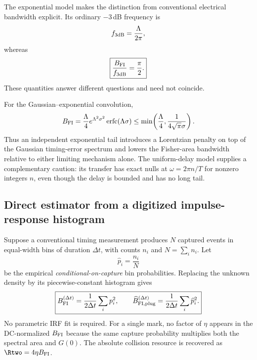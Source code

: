 The exponential model makes the distinction from conventional electrical bandwidth explicit. Its ordinary $-3\,$dB frequency is
\begin{equation}
f_{3\rm dB}=\frac{\Lambda}{2\pi},
\end{equation}
whereas
\begin{equation}
\boxed{\frac{B_{\rm FI}}{f_{3\rm dB}}=\frac{\pi}{2}.}
\label{eq:BFI3dB}
\end{equation}
These quantities answer different questions and need not coincide.

For the Gaussian--exponential convolution,
\begin{equation}
B_{\rm FI}
=\frac{\Lambda}{4}e^{\Lambda^2\sigma^2}\operatorname{erfc}(\Lambda\sigma)
\le \min\!\left(\frac{\Lambda}{4},\frac{1}{4\sqrt{\pi}\sigma}\right).
\label{eq:exGaussianBFI}
\end{equation}
Thus an independent exponential tail introduces a Lorentzian penalty on top of the Gaussian timing-error spectrum and lowers the Fisher-area bandwidth relative to either limiting mechanism alone. The uniform-delay model supplies a complementary caution: its transfer has exact nulls at $\omega=2\pi n/T$ for nonzero integers $n$, even though the delay is bounded and has no long tail.

\subsection{Direct estimator from a digitized impulse-response histogram}
\label{sec:histEstimator}

Suppose a conventional timing measurement produces $N$ captured events in equal-width bins of duration $\Delta t$, with counts $n_i$ and $N=\sum_i n_i$. Let
\begin{equation}
\widehat p_i=\frac{n_i}{N}
\end{equation}
be the empirical \emph{conditional-on-capture} bin probabilities. Replacing the unknown density by its piecewise-constant histogram gives
\begin{equation}
\boxed{
B_{\rm FI}^{(\Delta t)}
=\frac{1}{2\Delta t}\sum_i p_i^2,
\qquad
\widehat B_{\rm FI,plug}^{(\Delta t)}
=\frac{1}{2\Delta t}\sum_i\widehat p_i^2.}
\label{eq:histPlug}
\end{equation}
No parametric IRF fit is required. For a single mark, no factor of $\eta$ appears in the DC-normalized $B_{\rm FI}$ because the same capture probability multiplies both the spectral area and $G(0)$. The absolute collision resource is recovered as $\Rtwo=4\eta B_{\rm FI}$.

